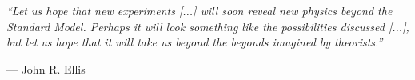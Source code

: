 
\begin{dedication} 


\raggedright\textit{``Let us hope that new experiments \textnormal{[...]} will soon reveal new physics beyond the Standard Model. Perhaps it will look something like the possibilities discussed \textnormal{[...]}, but let us hope that it will take us beyond the beyonds imagined by theorists.''
}
\par\raggedleft--- \textup{John R. Ellis}


\end{dedication}

